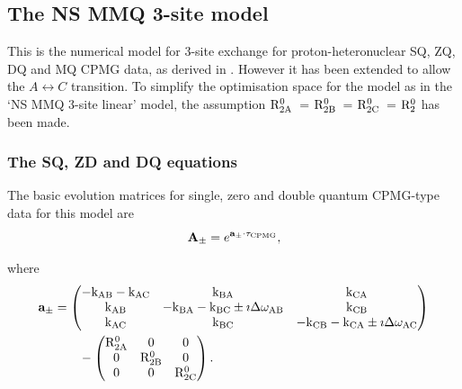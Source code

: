 
\subsection{The NS MMQ 3-site model}
\label{sect: dispersion: NS MMQ 3-site model}

This is the numerical model for 3-site exchange for proton-heteronuclear SQ, ZQ, DQ and MQ CPMG data, as derived in \citep{Korzhnev04a,Korzhnev04b,Korzhnev05b}.
However it has been extended to allow the $A \leftrightarrow C$ transition.
To simplify the optimisation space for the model as in the `NS MMQ 3-site linear' model, the assumption $\mathrm{R}_{\mathrm{2A}}^0$~= $\mathrm{R}_{\mathrm{2B}}^0$~= $\mathrm{R}_{\mathrm{2C}}^0$~= $\mathrm{R}_2^0$ has been made.


\subsubsection{The SQ, ZD and DQ equations}

The basic evolution matrices for single, zero and double quantum CPMG-type data for this model are
\begin{equation}
    \mathbf{A_{\pm}} = e^{\mathbf{a_{\pm}} \cdot \tau_{\textrm{CPMG}}},
\end{equation}

where
\begin{align}
    \mathbf{a_{\pm}} &= \begin{pmatrix}
                          -\textrm{k}_{\textrm{AB}} -\textrm{k}_{\textrm{AC}} & \textrm{k}_{\textrm{BA}}                          & \textrm{k}_{\textrm{CA}} \\
                          \textrm{k}_{\textrm{AB}}        & -\textrm{k}_{\textrm{BA}} -\textrm{k}_{\textrm{BC}} \pm\imath\Delta\omega_{\textrm{AB}}    & \textrm{k}_{\textrm{CB}} \\
                          \textrm{k}_{\textrm{AC}}        & \textrm{k}_{\textrm{BC}}                          & -\textrm{k}_{\textrm{CB}} -\textrm{k}_{\textrm{CA}} \pm\imath\Delta\omega_{\textrm{AC}}
                        \end{pmatrix}  \nonumber \\
                     &\qquad - \begin{pmatrix}
                                 \mathrm{R}_{\mathrm{2A}}^0 & 0          & 0    \\
                                 0          & \mathrm{R}_{\mathrm{2B}}^0 & 0    \\
                                 0          & 0          & \mathrm{R}_{\mathrm{2C}}^0
                               \end{pmatrix}.
\end{align}


